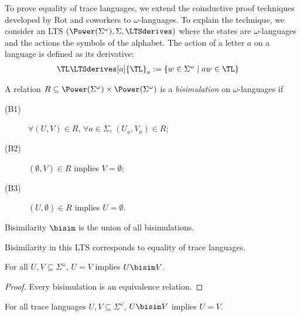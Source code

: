 To prove equality of trace languages, we extend the coinductive proof techniques developed by Rot
and coworkers \cite{DBLP:conf/lata/RotBR13} to $\omega$-languages. To explain the technique, we consider an LTS $(\Power
(\Sigma^\omega), \Sigma, \LTSderives)$ where the states are $\omega$-languages and the actions the
symbols of the alphabet. The action of a letter $a$ on a language is defined as its derivative:
\begin{align*}
  {\TL} & \LTSderives[a] {\TL}_a := \{ w \in \Sigma^\omega \mid aw \in {\TL} \}
\end{align*}
\begin{definition}\label{def:language-bisimulation}
  A relation $R \subseteq \Power(\Sigma^\omega) \times \Power(\Sigma^\omega)$ is a
 \emph{bisimulation} on $\omega$-languages if
  \begin{description}
  \item[(B1)] $\forall (U, V) \in R$, $\forall a \in \Sigma$, $(U_a,
    V_a) \in R$;


  \item[(B2)] $(\emptyset,V)  \in R$ implies $V = \emptyset$;
  \item[(B3)] $(U, \emptyset) \in R$ implies $U = \emptyset$.
  \end{description}
  Bisimilarity $\bisim$ is the union of all bisimulations.
\end{definition}
Bisimilarity in this LTS corresponds to equality of trace languages.
\begin{proposition}
  For all $U, V \subseteq \Sigma^\omega$,  $U=V$ implies $U\bisim V$. 
\end{proposition}
\begin{proof}
  Every bisimulation is an equivalence relation.
\end{proof}
\begin{proposition}\label{proposition:bisim=equality}
  For all trace languages $U, V \subseteq \Sigma^\omega$,  $U\bisim V$ implies $U=V$. 
\end{proposition}
